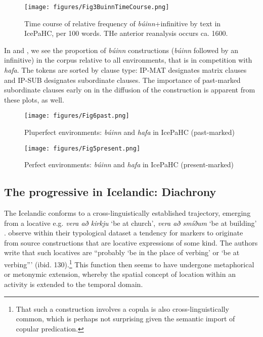 \documentclass[output=paper,colorlinks,citecolor=brown]{langscibook}
\begin{document}
 \begin{figure}
        \texttt{[image: figures/Fig3BuinnTimeCourse.png]}
        \caption{Time course of relative frequency of \textit{búinn}+infinitive by text in IcePaHC, per 100 words. THe anterior reanalysis occurs ca. 1600.}
        \label{fig:image2}
\end{figure}

In  and , we see the proportion of \textit{búinn} constructions (\textit{búinn} followed by an infinitive) in the  corpus relative to all   environments, that is in competition with \textit{hafa}. The tokens are sorted by clause type: IP-MAT designates matrix clauses and IP-SUB designates subordinate clauses. The importance of past-marked subordinate clauses early on in the diffusion of the construction is apparent from these plots, as well.

\begin{figure}
  \caption{Pluperfect environments: \textit{búinn} and \textit{hafa} in IcePaHC (past-marked)}
\texttt{[image: figures/Fig6past.png]}
\centering
\label{fig:pastcom}
\end{figure}

\begin{figure}
  \caption{Perfect environments: \textit{búinn} and \textit{hafa} in IcePaHC (present-marked)}
\texttt{[image: figures/Fig5present.png]}
\centering
\label{fig:prescom}
\end{figure}



\subsection{The progressive in Icelandic: Diachrony}\label{sec:Chark2.3}

The Icelandic  conforms to a cross-linguistically established trajectory, emerging from a locative \citep{bybee1994evolution} e.g. \textit{vera að kirkju} `be at church', \textit{vera að smíðum} `be at building' \citep{benediktsson1976isl}. \citet[129]{bybee1994evolution} observe within their typological dataset a tendency for   markers to originate from source constructions that are locative expressions of some kind. The authors write that such locatives are ``probably ‘be in the place of verbing' or ‘be at verbing''' (ibid. 130).\footnote{That such a construction involves a copula is also cross-linguistically common, which is perhaps not surprising given the semantic import of copular predication.} This function then seems to have undergone metaphorical or metonymic extension, whereby the spatial concept of location within an activity is extended to the temporal domain.
\end{document}
